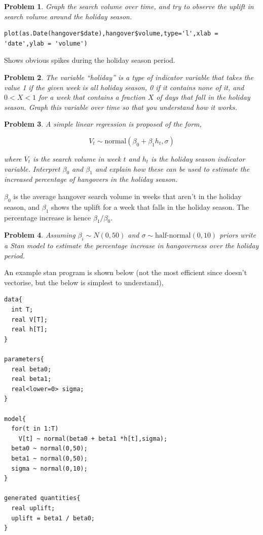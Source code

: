 \documentclass{article}
\newtheorem{problem}{Problem}[section]
\begin{document}
\begin{problem}
	Graph the search volume over time, and try to observe the uplift in search volume around the holiday season.
\end{problem}

\begin{verbatim}
plot(as.Date(hangover$date),hangover$volume,type='l',xlab = 'date',ylab = 'volume')
\end{verbatim}

Shows obvious spikes during the holiday season period.

\begin{problem}
The variable ``holiday'' is a type of indicator variable that takes the value 1 if the given week is \textit{all} holiday season, 0 if it contains none of it, and $0<X<1$ for a week that contains a fraction $X$ of days that fall in the holiday season. Graph this variable over time so that you understand how it works.
\end{problem}

\begin{problem}
A simple linear regression is proposed of the form,

\begin{equation}
V_t\sim \text{normal}(\beta_0+\beta_1 h_t,\sigma)
\end{equation}

where $V_t$ is the search volume in week $t$ and $h_t$ is the holiday season indicator variable. Interpret $\beta_0$ and $\beta_1$ and explain how these can be used to estimate the increased percentage of hangovers in the holiday season.
\end{problem}

$\beta_0$ is the average hangover search volume in weeks that aren't in the holiday season, and $\beta_1$ shows the uplift for a week that falls in the holiday season. The percentage increase is hence $\beta_1/\beta_0$.

\begin{problem}
	Assuming $\beta_i\sim N(0,50)$ and $\sigma\sim \text{half-normal}(0,10)$ priors write a Stan model to estimate the percentage increase in hangoverness over the holiday period.
\end{problem}

An example stan program is shown below (not the most efficient since doesn't vectorise, but the below is simplest to understand),

\begin{verbatim}
data{
  int T;
  real V[T];
  real h[T];
}

parameters{
  real beta0;
  real beta1;
  real<lower=0> sigma;
}

model{
  for(t in 1:T)
    V[t] ~ normal(beta0 + beta1 *h[t],sigma);
  beta0 ~ normal(0,50);
  beta1 ~ normal(0,50);
  sigma ~ normal(0,10);
}

generated quantities{
  real uplift;
  uplift = beta1 / beta0;
}
\end{verbatim}
\end{document}
